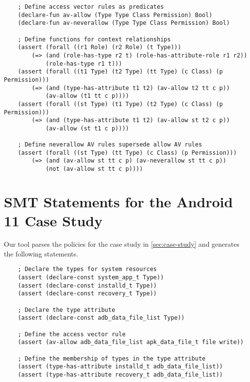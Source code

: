 \documentclass[acmsmall,screen,nonacm]{acmart}
\begin{document}
\begin{appendices}
\begin{small}
\begin{verbatim}
    ; Define access vector rules as predicates
    (declare-fun av-allow (Type Type Class Permission) Bool)
    (declare-fun av-neverallow (Type Type Class Permission) Bool)

    ; Define functions for context relationships
    (assert (forall ((r1 Role) (r2 Role) (t Type)))
        (=> (and (role-has-type r2 t) (role-has-attribute-role r1 r2))
            (role-has-type r1 t)))
    (assert (forall ((t1 Type) (t2 Type) (tt Type) (c Class) (p Permission)))
        (=> (and (type-has-attribute t1 t2) (av-allow t2 tt c p))
            (av-allow (t1 tt c p))))
    (assert (forall ((st Type) (t1 Type) (t2 Type) (c Class) (p Permission)))
        (=> (and (type-has-attribute t1 t2) (av-allow st t2 c p))
            (av-allow (st t1 c p))))

    ; Define neverallow AV rules supersede allow AV rules
    (assert (forall ((st Type) (tt Type) (c Class) (p Permission)))
        (=> (and (av-allow st tt c p) (av-neverallow st tt c p))
            (not (av-allow st tt c p))))
\end{verbatim}
\end{small}

\newpage

\section{SMT Statements for the Android 11 Case Study}
\label{appendix:android11}

Our tool parses the policies for the case study in \autoref{sec:case-study} and 
generates the following statements.

\begin{small}
\begin{verbatim}
    ; Declare the types for system resources
    (assert (declare-const system_app_t Type))
    (assert (declare-const installd_t Type))
    (assert (declare-const recovery_t Type))

    ; Declare the type attribute
    (assert (declare-const adb_data_file_list Type))

    ; Define the access vector rule
    (assert (av-allow adb_data_file_list apk_data_file_t file write))

    ; Define the membership of types in the type attribute
    (assert (type-has-attribute installd_t adb_data_file_list))
    (assert (type-has-attribute recovery_t adb_data_file_list))
\end{verbatim}
\end{small}


\end{appendices}
\end{document}
